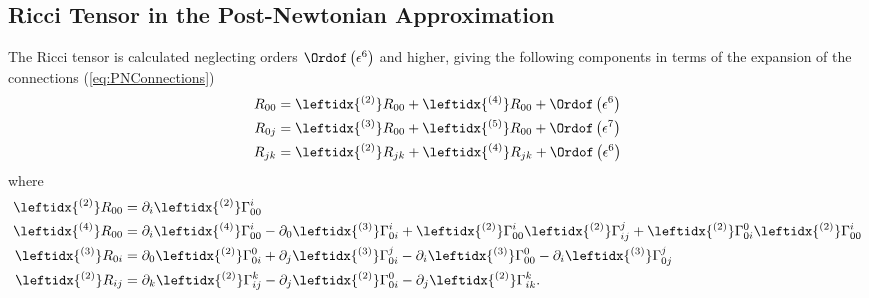 \subsection{Ricci Tensor in the Post-Newtonian Approximation}

The Ricci tensor is calculated neglecting orders $\Ordof \left( \epsilon^6 \right)$ and higher, giving the following components in terms of the expansion of the connections (\ref{eq:PNConnections})
\begin{subequations}
\begin{align}
R_{00} &= \leftidx{ ^{(2)}}R_{00} + \leftidx{ ^{(4)}} R_{00} + \Ordof \left( \epsilon^6 \right) \\
R_{0j} &= \leftidx{ ^{(3)}}R_{00} + \leftidx{ ^{(5)}} R_{00} + \Ordof \left( \epsilon^7 \right) \\
R_{jk} &= \leftidx{ ^{(2)}}R_{jk} + \leftidx{ ^{(4)}} R_{jk} + \Ordof \left( \epsilon^6 \right) 
\end{align}
\end{subequations}
where
\begin{subequations}
\begin{align}
\leftidx{ ^{(2)}}R_{00} &= \partial _i \leftidx{ ^{(2)}}\Gamma ^i_{00} \\
\leftidx{ ^{(4)}}R_{00} &= \partial _i \leftidx{ ^{(4)}}\Gamma ^i_{00} -  \partial _0 \leftidx{ ^{(3)}}\Gamma ^i_{0i}  + \leftidx{ ^{(2)}}\Gamma ^i_{00} \leftidx{ ^{(2)}}\Gamma ^j_{ij} + \leftidx{ ^{(2)}}\Gamma ^0_{0i} \leftidx{ ^{(2)}}\Gamma ^i_{00}\\
\leftidx{ ^{(3)}}R_{0i} &= \partial _0 \leftidx{ ^{(2)}}\Gamma ^0_{0i} +  \partial _j \leftidx{ ^{(3)}}\Gamma ^j_{0i} - \partial _i \leftidx{ ^{(3)}}\Gamma ^0_{00} - \partial _i \leftidx{ ^{(3)}}\Gamma ^j_{0j} \\
\leftidx{ ^{(2)}}R_{ij} &= \partial _k \leftidx{ ^{(2)}}\Gamma ^k_{ij} -  \partial _j \leftidx{ ^{(2)}}\Gamma ^0_{0i} - \partial _j \leftidx{ ^{(2)}}\Gamma ^k_{ik} .
\end{align}
\end{subequations}

